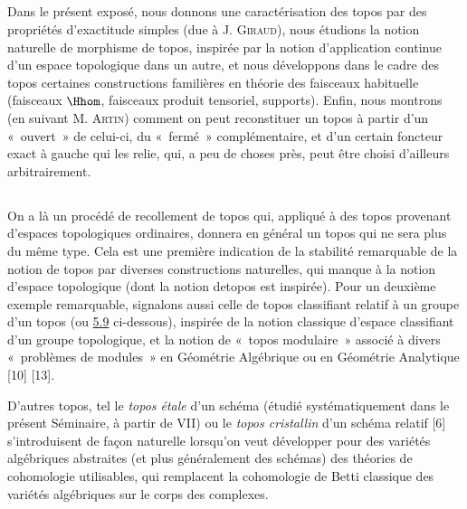 \documentclass[10pt]{../fichiers-configuration-latex/smfart}
\begin{document}
\subsection{}
Dans le présent exposé, nous donnons une caractérisation des topos
par des propriétés d'exactitude simples (due à J. \textsc{Giraud}),
nous étudions la notion naturelle de morphisme de topos, inspirée
par la notion d'application continue d'un espace topologique dans un
autre, et nous développons dans le cadre des topos certaines
constructions familières en théorie des faisceaux habituelle
(faisceaux $\Hhom$, faisceaux produit tensoriel, supports). Enfin,
nous montrons (en suivant M. \textsc{Artin}) comment on peut
reconstituer un topos à partir d'un « ouvert »  de celui-ci, du
« fermé » complémentaire, et d'un certain foncteur exact à
gauche qui les relie, qui, a peu de choses près, peut être choisi
d'ailleurs arbitrairement.

\subsection{}
On a là un procédé de recollement de topos qui, appliqué à des topos
provenant d'espaces topologiques ordinaires, donnera en général un
topos qui ne sera plus du même type. Cela est une première
indication de la stabilité remarquable de la notion de topos par
diverses constructions naturelles, qui manque à la notion d'espace
topologique (dont la notion de\pageoriginale topos est inspirée).
Pour un deuxième exemple remarquable, signalons aussi celle de topos
classifiant relatif à un groupe d'un topos (\cf [1] ou
\hyperref[IV.exer5.9]{5.9} ci-dessous), inspirée de la notion classique
d'espace classifiant d'un groupe topologique, et la notion de « topos modulaire »  associé à divers « problèmes de modules »
en Géométrie Algébrique ou en Géométrie Analytique [10] [13].

D'autres topos, tel le \emph{topos étale} d'un schéma (étudié
systématiquement dans le présent Séminaire, à partir de \Exp
VII) ou le \emph{topos cristallin} d'un schéma relatif [6]
s'introduisent de façon naturelle lorsqu'on veut développer
pour des variétés algébriques abstraites (et plus
généralement des schémas) des théories de cohomologie
utilisables, qui remplacent la cohomologie de Betti classique des
variétés algébriques sur le corps des complexes.
\end{document}
